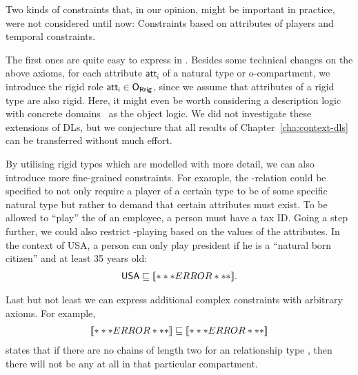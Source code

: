 
Two kinds of constraints that, in our opinion, might be important in practice, were not considered
until now: Constraints based on attributes of players and temporal constraints.

The first ones are quite easy to express in \LMLO. Besides some technical changes on the above
axioms, for each attribute $\mathsf{att_{i}}$ of a natural type or o-compartment, we introduce the
rigid role $\mathsf{att_{i}}\in\ORR$, since we assume that attributes of a rigid type are also
rigid.  Here, it might even be worth considering a description logic with concrete
domains~\cite{Lutz-PHD02,Lut-AiML02} as the object logic. We did not investigate these extensions of
DLs, but we conjecture that all results of Chapter~\ref{cha:context-dls} can be transferred without
much effort.

By utilising rigid types which are modelled with more detail, we can also introduce more fine-grained
constraints. For example, the \fills-relation could be specified to not only require a player of a
certain \rosirole type to be of some specific natural type but rather to demand that certain
attributes must exist. To be allowed to ``play'' the \rosirole of an employee, a person must have a
tax ID. Going a step further, we could also restrict \rosirole-playing based on the values of the
attributes. In the context of USA, a person can only play president if he is a ``natural born
citizen'' and at least 35 years old:
\begin{align*}
  \mathsf{USA} \sqsubseteq\oax{\exists\plays.\mathsf{President} \sqsubseteq \mathsf{Person} \sqcap
  \exists \mathsf{natural\_born\_citizen}.\{\true\} \sqcap \exists\mathsf{age \geq_{35}}}.
\end{align*}

Last but not least we can express additional complex constraints with arbitrary \LMLO axioms. For
example,
\begin{align*}
  \oax{\exists\rst.(\exists\rst.\top)\sqsubseteq\bot} \sqsubseteq \oax{\exists\rst.\top\sqsubseteq\bot}
\end{align*}
states that if there are no chains of length two for an relationship type \rst, then there will not
be any \rst at all in that particular compartment.


\cleardoublepage


